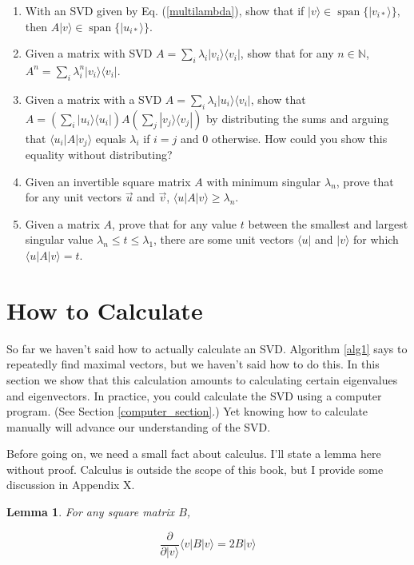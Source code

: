 \documentclass{amsbook}
\newtheorem{lemma}[theorem]{Lemma}
\begin{document}
\begin{enumerate}
\item With an SVD given by Eq. (\ref{multilambda}), show that if $|v\rangle\in\operatorname{span}\{|v_{i*}\rangle\}$, then $A|v\rangle\in\operatorname{span}\{|u_{i*}\rangle\}$.
\item Given a matrix with SVD $A=\sum_i\lambda_i|v_i\rangle\langle v_i|$, show that for any $n\in\mathbb N$, $A^n=\sum_i\lambda_i^n|v_i\rangle\langle v_i|$.
\item Given a matrix with a SVD $A=\sum_i\lambda_i|u_i\rangle\langle v_i|$, show that $A=\left(\sum_i|u_i\rangle\langle u_i|\right)A\left(\sum_j|v_j\rangle\langle v_j|\right)$ by distributing the sums and arguing that $\langle u_i|A|v_j\rangle$ equals $\lambda_i$ if $i=j$ and $0$ otherwise.  How could you show this equality without distributing?
\item Given an invertible square matrix $A$ with minimum singular $\lambda_n$, prove that for any unit vectors $\vec u$ and $\vec v$, $\langle u|A|v\rangle\geq\lambda_n$.
\item Given a matrix $A$, prove that for any value $t$ between the smallest and largest singular value $\lambda_n\leq t\leq\lambda_1$, there are some unit vectors $\langle u|$ and $|v\rangle$ for which $\langle u|A|v\rangle=t$.
\end{enumerate}

\section{How to Calculate}\label{How to Calculate}

So far we haven't said how to actually calculate an SVD.  Algorithm \ref{alg1} says to repeatedly find maximal vectors, but we haven't said how to do this.  In this section we show that this calculation amounts to calculating certain eigenvalues and eigenvectors.  In practice, you could calculate the SVD using a computer program.  (See Section \ref{computer_section}.)  Yet knowing how to calculate manually will advance our understanding of the SVD.

Before going on, we need a small fact about calculus.  I'll state a lemma here without proof.  Calculus is outside the scope of this book, but I provide some discussion in Appendix X.

\begin{lemma}
\label{calc}
For any square matrix $B$,

$$
\frac{\partial}{\partial|v\rangle}\langle v|B|v\rangle = 2B|v\rangle
$$
\end{lemma}
\end{document}
